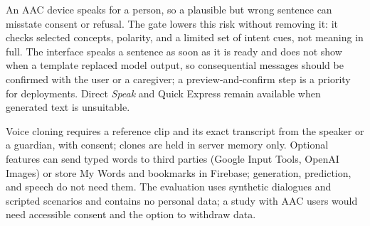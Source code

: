 An AAC device speaks for a person, so a plausible but wrong sentence can misstate consent or refusal.
The gate lowers this risk without removing it: it checks selected concepts, polarity, and a limited set of intent cues, not meaning in full.
The interface speaks a sentence as soon as it is ready and does not show when a template replaced model output, so consequential messages should be confirmed with the user or a caregiver; a preview-and-confirm step is a priority for deployments.
Direct \emph{Speak} and Quick Express remain available when generated text is unsuitable.

Voice cloning requires a reference clip and its exact transcript from the speaker or a guardian, with consent; clones are held in server memory only.
Optional features can send typed words to third parties (Google Input Tools, OpenAI Images) or store My Words and bookmarks in Firebase; generation, prediction, and speech do not need them.
The evaluation uses synthetic dialogues and scripted scenarios and contains no personal data; a study with AAC users would need accessible consent and the option to withdraw data.
